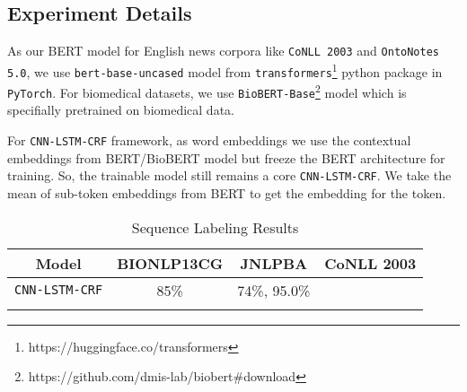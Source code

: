 \subsection{Experiment Details}
As our BERT model for English news corpora like \texttt{CoNLL 2003} and \texttt{OntoNotes 5.0}, we use \texttt{bert-base-uncased} model from \texttt{transformers}\footnote{https://huggingface.co/transformers} python package in \texttt{PyTorch}. For biomedical datasets, we use \texttt{BioBERT-Base}\footnote{https://github.com/dmis-lab/biobert#download} model which is specifially pretrained on biomedical data.


For \texttt{CNN-LSTM-CRF} framework, as word embeddings we use the contextual embeddings from BERT/BioBERT model but freeze the BERT architecture for training. So, the trainable model still remains a core \texttt{CNN-LSTM-CRF}. We take the mean of sub-token embeddings from BERT to get the embedding for the token.

\begin{table}
\centering
\begin{tabular}{|c|c|c|c|}\hline
	\textbf{Model} & \textbf{BIONLP13CG} & \textbf{JNLPBA} & \textbf{CoNLL 2003}\\\hline
	\texttt{CNN-LSTM-CRF} & 85\% & 74\%, 95.0\% \\\hine
	\end{tabular}
	\label{tab:res_seq_tagging}
    \caption{Sequence Labeling Results}
\end{table}